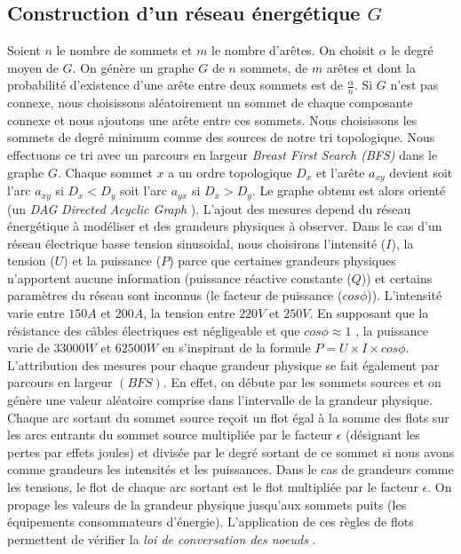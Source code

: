 \documentclass[onecolumn, 12pt]{book}
\begin{document}
\subsection{Construction d'un r\'eseau \'energ\'etique $G$}
Soient $n$ le nombre de sommets et $m$ le nombre d'ar\^etes.
On choisit $\alpha$ le degr\'e moyen de $G$.
\newline
On g\'en\`ere un graphe $G$ de $n$ sommets, de $m$ ar\^etes et dont la probabilit\'e d'existence d'une ar\^ete entre deux sommets est de $\frac{\alpha}{n}$. Si $G$ n'est pas connexe, nous choisissons al\'eatoirement un sommet de chaque composante connexe et nous ajoutons une ar\^ete entre ces sommets. 
\newline
Nous choisissons les sommets de degr\'e minimum comme des sources de notre tri topologique.
Nous effectuons ce tri avec un parcours en largeur {\em Breast First Search (BFS)} dans le graphe $G$.
Chaque sommet $x$ a un ordre topologique $D_x$ et l'ar\^ete $a_{xy}$ devient soit l'arc $a_{xy}$ si $D_x < D_y$ soit l'arc $a_{yx}$ si $D_x > D_y$. 
Le graphe obtenu est alors orient\'e (un {\em DAG} {\em Directed Acyclic Graph} ).
\newline
L'ajout des mesures depend du r\'eseau \'energ\'etique \`a mod\'eliser et des grandeurs physiques \`a observer. 
Dans le cas d'un r\'eseau \'electrique basse tension sinusoidal, nous choisirons l'intensit\'e ($I$), la tension ($U$) et la puissance ($P$) parce que certaines grandeurs physiques n'apportent aucune information (puissance r\'eactive constante ($Q$)) et certains param\`etres du r\'eseau sont inconnus (le facteur de puissance ($cos \phi$)).
L'intensit\'e varie entre $150A$ et $200A$, la tension entre  $220V$ et $250V$. 
En supposant que la r\'esistance des c\^ables \'electriques est n\'egligeable et que $cos \phi \approx 1$ , la puissance varie de $33000W$ et $62500W$ en s'inspirant de la formule $P = U \times I \times cos \phi$.
\newline
L'attribution des mesures pour chaque grandeur physique se fait \'egalement par parcours en largeur $(BFS)$. 
En effet,  on d\'ebute par les sommets sources et on g\'en\`ere une valeur al\'eatoire comprise dans l'intervalle de la grandeur physique. 
Chaque arc sortant du sommet source re\c coit  un flot \'egal \`a la somme des flots sur les arcs entrants du sommet source multipli\'ee par le facteur $\epsilon$ (d\'esignant les pertes par effets joules) et divis\'ee par le degr\'e sortant de ce sommet si nous avons comme grandeurs les intensit\'es et les puissances.
Dans le cas de grandeurs comme les tensions, le flot de chaque arc sortant est le flot multipli\'ee par le facteur $\epsilon$. 
On propage les valeurs de la grandeur physique jusqu'aux sommets puits (les \'equipements consommateurs d'\'energie).
L'application de ces r\`egles de flots permettent de v\'erifier la {\em loi de conversation des noeuds} \cite{loiDeConservation}.
\end{document}
